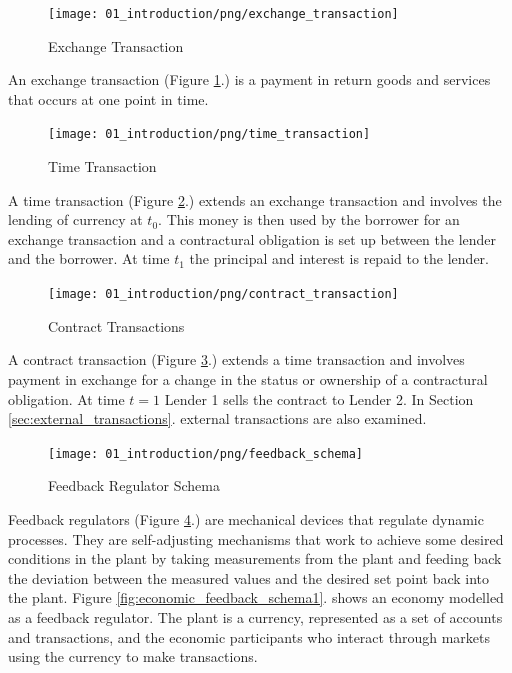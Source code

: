 \begin{figure}[H]
\centering
\texttt{[image: 01\_introduction/png/exchange\_transaction]}
\caption{Exchange Transaction}
\label{fig:exchange_transaction1}
\end{figure}

An exchange transaction (Figure \ref{fig:exchange_transaction1}.) is a payment in return goods and
services that occurs at one point in time.

\begin{figure}[H]
\centering
\texttt{[image: 01\_introduction/png/time\_transaction]}
\caption{Time Transaction}
\label{fig:time_transaction1}
\end{figure}

A time transaction (Figure \ref{fig:time_transaction1}.) extends an exchange transaction and involves
the lending of currency at $t_0$.  This money is then used by the borrower for an exchange
transaction and a contractural obligation is set up between the lender and the borrower. At time
$t_1$ the principal and interest is repaid to the lender.

\begin{figure}[H]
\centering
\texttt{[image: 01\_introduction/png/contract\_transaction]}
\caption{Contract Transactions}
\label{fig:contract_transaction1}
\end{figure}

A contract transaction (Figure \ref{fig:contract_transaction1}.) extends a time transaction and
involves payment in exchange for a change in the status or ownership of a contractural obligation.
At time $t=1$ Lender 1 sells the contract to Lender 2. In Section \ref{sec:external_transactions}.
external transactions are also examined.

\begin{figure}[H]
\centering
\texttt{[image: 01\_introduction/png/feedback\_schema]}
\caption{Feedback Regulator Schema}
\label{fig:feedback_schema1}
\end{figure}

Feedback regulators (Figure \ref{fig:feedback_schema1}.) are mechanical devices that regulate
dynamic processes. They are self-adjusting mechanisms that work to achieve some desired conditions
in the plant by taking measurements from the plant and feeding back the deviation between the
measured values and the desired set point back into the plant. Figure
\ref{fig:economic_feedback_schema1}. shows an economy modelled as a feedback regulator. The plant
is a currency, represented as a set of accounts and transactions, and the economic participants who
interact through markets using the currency to make transactions.

